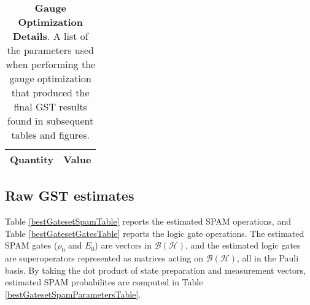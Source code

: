 \documentclass{article}[11pt]
\begin{document}
\begin{table}[h]
\begin{center}
\begin{tabular}[l]{|c|c|}
\hline
\textbf{Quantity} & \textbf{Value} \\ \hline
\end{tabular}

\caption{\textbf{Gauge Optimization Details}.  A list of the parameters used when performing the gauge optimization that produced the final GST results found in subsequent tables and figures.\label{bestGatesetGaugeParamsTable}}
\end{center}
\end{table}


\subsection{Raw GST estimates}

Table \ref{bestGatesetSpamTable} reports the estimated SPAM operations, and Table \ref{bestGatesetGatesTable} reports the logic gate operations.  The estimated SPAM gates ($\rho_0$ and $E_0$) are vectors in $\mathcal{B}(\mathcal{H})$, and the estimated logic gates are superoperators represented as matrices acting on $\mathcal{B}(\mathcal{H})$, all in the Pauli basis.   By taking the dot product of state preparation and measurement vectors, estimated SPAM probabilites are computed in Table \ref{bestGatesetSpamParametersTable}.
\iftoggle{confidences}{
Tables \ref{bestGatesetSpamTable} and \ref{bestGatesetGatesTable} report 95\% confidence intervals for each of the gate matrix and SPAM vector elements.  A confidence region is obtained by approximating the log-likelihood (see below) as being quadratic about its minimum, and determining the ellipsoid where this approximation equals a value, $C$, defined below.  For a given parameter (e.g. gate or SPAM vector element) $x$, a confidence interval is obtained by projecting the ellipsiodal region onto that $x$'s axis.  This computes a 1-dimensional 95\% confidence interval for the profile log-liklihood for $x$, and for this reason the value of $C$ used above is chosen such that $\mathrm{CDF}[\chi^2_1](C) = 95\%$ (that is, at the value $C$ the cumulative density function of a $\chi^2_1$ distribution reaches 95\%).  If, instead, the interval corresponding to a projection of the 95\% multi-dimensional confidence region (defined by $C$ s.t.~$\mathrm{CDF}[\chi^2_n](C) = 95\%$, where $n=31$ is the number of non-gauge gate set parameters) is desired, then the all the interval widths reported here should be multiplied by 3.42.  The resulting confidence interval is always symmetric about the estimated value, and we report the half-width of the intervals in the tables.  In table \ref{bestGatesetSpamParametersTable} and those in the following section, we specify the 95\% confidence intervals of derived quantities in using \emph{value} $\pm$ \emph{half-width} notation.  The derived-quantity confidence intervals in section \ref{derivedQtySection} are computed by finding the minimum and maximum values of the linearization of the derived quantity (e.g.~fidelity).
}{}
\end{document}
